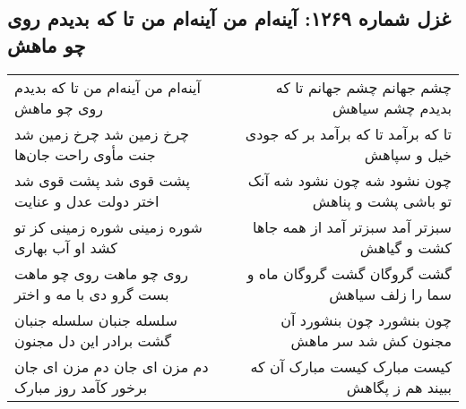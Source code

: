 \begin{center}
\section*{غزل شماره ۱۲۶۹: آینه‌ام من آینه‌ام من تا که بدیدم روی چو ماهش}
\label{sec:1269}
\begin{longtable}{l p{0.5cm} r}
آینه‌ام من آینه‌ام من تا که بدیدم روی چو ماهش
&&
چشم جهانم چشم جهانم تا که بدیدم چشم سیاهش
\\
چرخ زمین شد چرخ زمین شد جنت مأوی راحت جان‌ها
&&
تا که برآمد تا که برآمد بر که جودی خیل و سپاهش
\\
پشت قوی شد پشت قوی شد اختر دولت عدل و عنایت
&&
چون نشود شه چون نشود شه آنک تو باشی پشت و پناهش
\\
شوره زمینی شوره زمینی کز تو کشد او آب بهاری
&&
سبزتر آمد سبزتر آمد از همه جاها کشت و گیاهش
\\
روی چو ماهت روی چو ماهت بست گرو دی با مه و اختر
&&
گشت گروگان گشت گروگان ماه و سما را زلف سیاهش
\\
سلسله جنبان سلسله جنبان گشت برادر این دل مجنون
&&
چون بنشورد چون بنشورد آن مجنون کش شد سر ماهش
\\
دم مزن ای جان دم مزن ای جان برخور کآمد روز مبارک
&&
کیست مبارک کیست مبارک آن که ببیند هم ز پگاهش
\\
\end{longtable}
\end{center}
